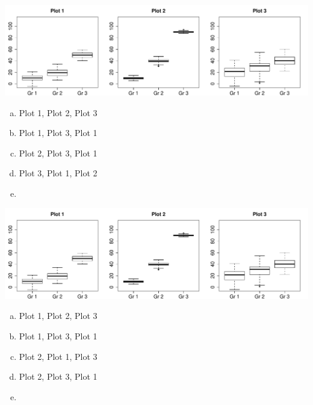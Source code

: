 \documentclass[slidestop,compress,mathserif]{beamer}
\begin{document}
\begin{frame}


\begin{center}
\includegraphics[width=\textwidth]{figures/within_between/within_between}
\end{center}

\begin{multicols}{2}
\begin{enumerate}[(a)]
\item Plot 1, Plot 2, Plot 3
\item Plot 1, Plot 3, Plot 1
\item Plot 2, Plot 3, Plot 1
\item Plot 3, Plot 1, Plot 2
\item[]
\end{enumerate}
\end{multicols}

\end{frame}


\begin{frame}


\begin{center}
\includegraphics[width=\textwidth]{figures/within_between/within_between}
\end{center}

\begin{multicols}{2}
\begin{enumerate}[(a)]
\item Plot 1, Plot 2, Plot 3
\item Plot 1, Plot 3, Plot 1
\item Plot 2, Plot 1, Plot 3
\item Plot 2, Plot 3, Plot 1
\item[]
\end{enumerate}
\end{multicols}

\end{frame}
\end{document}
